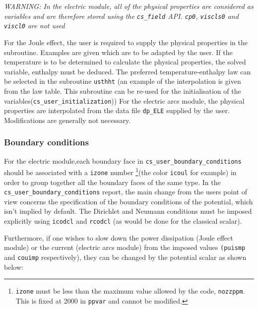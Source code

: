 {{{{\em WARNING: In the electric module, all of the physical properties are considered as variables
 and are therefore stored using the \texttt{cs\_field} API. \texttt{cp0}, \texttt{viscls0} and \texttt{viscl0}
 are not used}

For the Joule effect, the user is required to supply the physical properties in the
subroutine. Examples are given which are to be adapted by the user. If the temperature is
to be determined to calculate the physical properties, the solved variable, enthalpy must
 be deduced. The preferred temperature-enthalpy law can be selected in the subroutine
 \texttt{usthht} (an example of the interpolation is given from the law table. This
subroutine can be re-used for the initialisation of the variables(\texttt{cs\_user\_initialization}))
 For the electric arcs module, the physical properties are interpolated from the data file
 \texttt{dp\_ELE} supplied by the user. Modifications are generally not necessary.

\subsubsection{Boundary conditions}

For the electric module,each boundary face in \texttt{cs\_user\_boundary\_conditions} should be associated with a
 \texttt{izone} number \footnote{\texttt{izone} must be less than the maximum
 value allowed by the code, \texttt{nozzppm}. This is fixed at 2000 in \texttt
{ppvar} and cannot be modified.}(the color \texttt{icoul} for example) in
 order to group together all the boundary faces of the same type. In the
 \texttt{cs\_user\_boundary\_conditions} report, the main change from the users point of view concerns the
 specification of the boundary conditions of the potential, which isn't
 implied by default. The Dirichlet and Neumann conditions must be imposed
 explicitly using \texttt{icodcl} and \texttt{rcodcl} (as would be done for
 the classical scalar).

Furthermore, if one wishes to slow down the power dissipation (Joule
effect module) or the current (electric arcs module) from the imposed values
\texttt{(puismp} and \texttt{couimp} respectively),
 they can be changed by the potential scalar as shown below:

}}}

